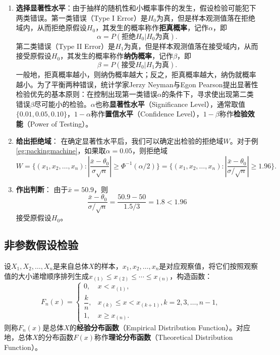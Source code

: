 \begin{enumerate}[Step 1.]
  \item
  \textbf{选择显著性水平}：由于抽样的随机性和小概率事件的发生，假设检验可能犯下两类错误。第一类错误（Type I Error）是$H_0$为真，但是样本观测值落在拒绝域内，从而拒绝原假设$H_0$，其发生的概率称作\textbf{拒真概率}，记作$\alpha$，即
  \[\alpha = P(\text{拒绝}H_0|H_0\text{为真}).\]%
  第二类错误（Type II Error）是$H_1$为真，但是样本观测值落在接受域内，从而接受原假设$H_0$，其发生的概率称作\textbf{纳伪概率}，记作$\beta$，即
  \[\beta = P(\text{接受}H_0|H_1\text{为真}).\]%
  一般地，拒真概率越小，则纳伪概率越大；反之，拒真概率越大，纳伪就概率越小。为了平衡两种错误，统计学家Jerzy Neyman与Egon Pearson提出显著性检验优先的基本原则：在控制出现第一类错误$\alpha$的条件下，寻求使出现第二类错误$\beta$尽可能小的检验。$\alpha$也称\textbf{显著性水平}（Significance Level），通常取值$\{0.01,0.05,0.10\}$，$1-\alpha$称作\textbf{置信水平}（Confidence Level），$1-\beta$称作\textbf{检验效能}（Power of Testing）。
  \item \textbf{给出拒绝域}：
  在确定显著性水平后，我们可以确定出检验的拒绝域$W$。对于例\ref{eg:packingmachine}，如果取$\alpha=0.05$，则拒绝域
  \[
    W=\{(x_1,x_2,\ldots,x_n): |\frac{\bar x-\theta_0}{\sigma\sqrt n}| \ge \Phi^{-1}(\alpha/2)\} = \{(x_1,x_2,\ldots,x_n): |\frac{\bar x-\theta_0}{\sigma/\sqrt n}| \ge 1.96\}.
  \]
  \item \textbf{作出判断}：
  由于$\bar x=50.9$，则\[
    \frac{\bar x - \theta_0}{\sigma/\sqrt n}=\frac{50.9-50}{1.5/3}=1.8 < 1.96
  \]
  接受原假设$H_0$。
\end{enumerate}

\subsection{非参数假设检验}%
\begin{definition}[经验分布函数]
设$X_1, X_2, \ldots, X_n$是来自总体$X$的样本，$x_1, x_2, \ldots, x_n$是对应观察值，将它们按照观察值的大小递增顺序排列生成$x_{(1)}\le x_{(2)}\le \cdots \le x_{(n)}$，构造函数：
\[
    F_n(x) = \left\{
    \begin{array}{rl}
    0, & x<x_{(1)},\\
    \dfrac{k}{n}, & x_{(k)}\le x<x_{(k+1)}, k = 2,3,\ldots, n-1,\\
    1, & x \ge x_{(n)}.
    \end{array}
    \right.
\]
则称$F_n(x)$是总体$X$的\textbf{经验分布函数}（Empirical Distribution Function）。对应地，总体$X$的分布函数$F(x)$称作\textbf{理论分布函数}（Theoretical Distribution Function）。
\end{definition}

